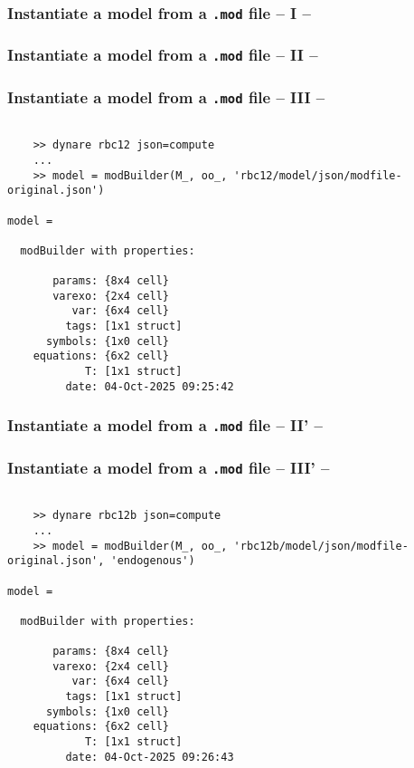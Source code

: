\documentclass[10pt,slidestop]{beamer}
\theoremstyle{plain}
\begin{document}
\begin{frame}[fragile]
  \frametitle{Instantiate a model from a \texttt{.mod} file -- I --}

  

\end{frame}

\begin{frame}[fragile]
  \frametitle{Instantiate a model from a \texttt{.mod} file -- II --}

  

\end{frame}


\begin{frame}[fragile]
  \frametitle{Instantiate a model from a \texttt{.mod} file -- III --}

  \begin{lstlisting}[style=MatlabConsole]

    >> dynare rbc12 json=compute
    ...
    >> model = modBuilder(M_, oo_, 'rbc12/model/json/modfile-original.json')

model =

  modBuilder with properties:

       params: {8x4 cell}
       varexo: {2x4 cell}
          var: {6x4 cell}
         tags: [1x1 struct]
      symbols: {1x0 cell}
    equations: {6x2 cell}
            T: [1x1 struct]
         date: 04-Oct-2025 09:25:42
   \end{lstlisting}

\end{frame}


\begin{frame}[fragile]
  \frametitle{Instantiate a model from a \texttt{.mod} file -- II' --}

  

\end{frame}


\begin{frame}[fragile]
  \frametitle{Instantiate a model from a \texttt{.mod} file -- III' --}

  \begin{lstlisting}[style=MatlabConsole]

    >> dynare rbc12b json=compute
    ...
    >> model = modBuilder(M_, oo_, 'rbc12b/model/json/modfile-original.json', 'endogenous')

model =

  modBuilder with properties:

       params: {8x4 cell}
       varexo: {2x4 cell}
          var: {6x4 cell}
         tags: [1x1 struct]
      symbols: {1x0 cell}
    equations: {6x2 cell}
            T: [1x1 struct]
         date: 04-Oct-2025 09:26:43
   \end{lstlisting}

\end{frame}
\end{document}
